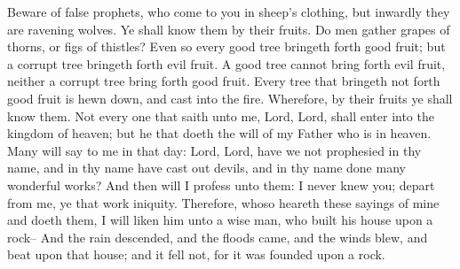 Beware of false prophets, who come to you in sheep's clothing, but inwardly they are ravening wolves.
\bverse \iffalse Ye shall know them by their fruits. Do men gather grapes of thorns, or figs of thistles? \fi
Ye shall know them by their fruits. Do men gather grapes of thorns, or figs of thistles?
\bverse \iffalse Even so every good tree bringeth forth good fruit; but a corrupt tree bringeth forth evil fruit. \fi
Even so every good tree bringeth forth good fruit; but a corrupt tree bringeth forth evil fruit.
\bverse \iffalse A good tree cannot bring forth evil fruit, neither a corrupt tree bring forth good fruit. \fi
A good tree cannot bring forth evil fruit, neither a corrupt tree bring forth good fruit.
\bverse \iffalse Every tree that bringeth not forth good fruit is hewn down, and cast into the fire. \fi
Every tree that bringeth not forth good fruit is hewn down, and cast into the fire.
\bverse \iffalse Wherefore, by their fruits ye shall know them. \fi
Wherefore, by their fruits ye shall know them.
\bverse \iffalse Not every one that saith unto me, Lord, Lord, shall enter into the kingdom of heaven; but he that doeth the will of my Father who is in heaven. \fi
Not every one that saith unto me, Lord, Lord, shall enter into the kingdom of heaven; but he that doeth the will of my Father who is in heaven.
\bverse \iffalse Many will say to me in that day: Lord, Lord, have we not prophesied in thy name, and in thy name have cast out devils, and in thy name done many wonderful works? \fi
Many will say to me in that day: Lord, Lord, have we not prophesied in thy name, and in thy name have cast out devils, and in thy name done many wonderful works?
\bverse \iffalse And then will I profess unto them: I never knew you; depart from me, ye that work iniquity. \fi
And then will I profess unto them: I never knew you; depart from me, ye that work iniquity.
\bverse \iffalse Therefore, whoso heareth these sayings of mine and doeth them, I will liken him unto a wise man, who built his house upon a rock-- \fi
Therefore, whoso heareth these sayings of mine and doeth them, I will liken him unto a wise man, who built his house upon a rock--
\bverse \iffalse And the rain descended, and the floods came, and the winds blew, and beat upon that house; and it fell not, for it was founded upon a rock. \fi
And the rain descended, and the floods came, and the winds blew, and beat upon that house; and it fell not, for it was founded upon a rock.
